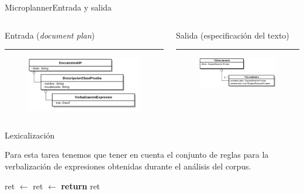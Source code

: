 \documentclass[pdf]{beamer}
\begin{document}
\begin{frame}[fragile]{Microplanner}{Entrada y salida}
\begin{columns}[T] %
\begin{column}{.50\textwidth}
  Entrada (\textit{document plan})
    \rule{\linewidth}{1pt}

  \begin{figure}[H]
    \centering
    \includegraphics[scale=0.13]{img/document_plan.png}
  \end{figure}
\end{column}%
\hfill%
\begin{column}{.50\textwidth}
Salida (especificación del texto)
\rule{\linewidth}{1pt}

  \begin{figure}[H]
    \centering
    \includegraphics[scale=0.2]{img/text_spec.png}
  \end{figure}
\end{column}%
\end{columns}
\end{frame}
                                
\begin{frame}[fragile]{Lexicalización}{}

  Para esta tarea tenemos que tener en cuenta el conjunto de reglas para la verbalización de expresiones obtenidas durante el análisis del corpus.
  
  \begin{algorithm}[H]
    \caption{Bosquejo algoritmo lexicalización}
    \scriptsize
    \begin{algorithmic}[1]
    \State ret $\gets$ 
    \Else
    \State ret $\gets$ 
    \EndIf
    \State \textbf{return} ret
    \EndFunction
    \end{algorithmic}
  \end{algorithm}
\end{frame}
\end{document}
